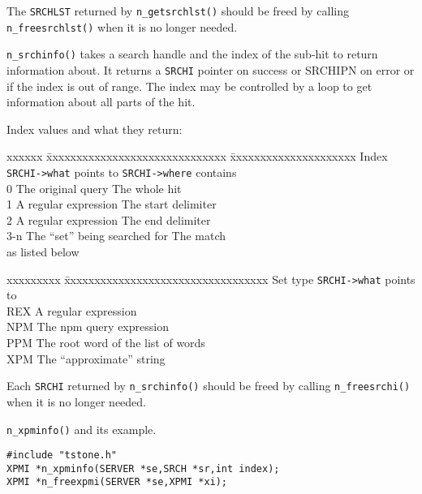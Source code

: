 The \verb`SRCHLST` returned by \verb`n_getsrchlst()` should be freed by
calling \verb`n_freesrchlst()` when it is no longer needed.

\verb`n_srchinfo()` takes a search handle and the index of the sub-hit
to return information about.  It returns a \verb`SRCHI` pointer on
success or SRCHIPN on error or if the index is out of range.  The index
may be controlled by a loop to get information about all parts of the
hit.

Index values and what they return:
\begin{tabbing}
xxxxxx \= xxxxxxxxxxxxxxxxxxxxxxxxxxxxxx \= xxxxxxxxxxxxxxxxxxxxx \kill
Index  \> \verb`SRCHI->what` points to   \> \verb`SRCHI->where` contains \\
0      \> The original query             \> The whole hit         \\
1      \> A regular expression           \> The start delimiter   \\
2      \> A regular expression           \> The end delimiter     \\
3-n    \> The ``set'' being searched for \> The match             \\
       \> as listed below                \>                       \\
\end{tabbing}

\begin{tabbing}
xxxxxxxxx \= xxxxxxxxxxxxxxxxxxxxxxxxxxxxxxxxxx \kill
Set type  \> \verb`SRCHI->what` points to       \\
REX       \> A regular expression               \\
NPM       \> The npm query expression           \\
PPM       \> The root word of the list of words \\
XPM       \> The ``approximate'' string         \\
\end{tabbing}

Each \verb`SRCHI` returned by \verb`n_srchinfo()` should be freed by
calling \verb`n_freesrchi()` when it is no longer needed.

\SEE
\verb`n_xpminfo()` and its example.


\SYNOPSIS
\begin{verbatim}
#include "tstone.h"
XPMI *n_xpminfo(SERVER *se,SRCH *sr,int index);
XPMI *n_freexpmi(SERVER *se,XPMI *xi);

\end{verbatim}

